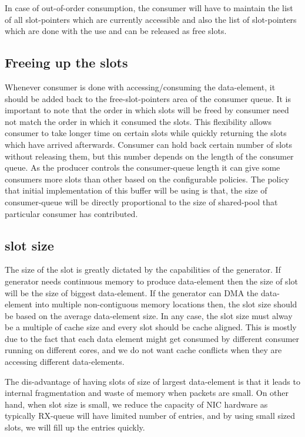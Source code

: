 \documentclass[a4paper,twoside]{report} %
\begin{document}
In case of out-of-order consumption, the consumer will have to
maintain the list of all slot-pointers which are currently accessible
and also the list of slot-pointers which are done with the use and can
be released as free slots.

\subsection{Freeing up the slots}
Whenever consumer is done with accessing/consuming the data-element,
it should be added back to the free-slot-pointers area of the consumer 
queue.  It is important to note that the order in which slots will be
freed by consumer need not match the order in which it consumed the
slots.  This flexibility allows consumer to take longer time on
certain slots while quickly returning the slots which have arrived
afterwards.  Consumer can hold back certain number of slots without
releasing them, but this number depends on the length of the consumer
queue.  As the producer controls the consumer-queue length it can give
some consumers more slots than other based on the configurable
policies.  The policy that initial implementation of this buffer will
be using is that, the size of consumer-queue will be directly
proportional to the size of shared-pool that particular consumer has
contributed.

\subsection{slot size}
\label{sec:slotsize}
The size of the slot is greatly dictated by the capabilities of the
generator.  If generator needs
continuous memory to produce data-element then the size of
slot will be the size of biggest data-element.  If the
generator can DMA the data-element into multiple non-contiguous
memory locations then, the slot size should be based on
the average data-element size.  In any case, the slot size
must alway be a multiple of cache size and every slot should
be cache aligned.  This is mostly due to the fact that each
data element might get consumed by different consumer running
on different cores, and we do not want cache conflicts when
they are accessing different data-elements.


The dis-advantage of having slots of size of largest data-element
is that it leads to internal fragmentation and waste of memory 
when packets are small.  On other hand, when slot size is small,
we reduce the capacity of NIC hardware as typically RX-queue
will have limited number of entries, and by using small sized
slots, we will fill up the entries quickly.
\end{document}
